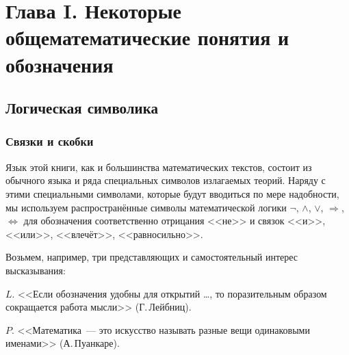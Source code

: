 
\chapter*{Глава I. Некоторые общематематические понятия и обозначения}

\section{Логическая символика}

\subsection{Связки и скобки}

Язык этой книги, как и большинства математических текстов, состоит из обычного языка и ряда специальных символов излагаемых теорий. Наряду с этими специальными символами, которые будут вводиться по мере надобности, мы используем распространённые символы математической логики $\neg$, $\land$, $\lor$, $\Rightarrow$, $\Leftrightarrow$ для обозначения соответственно отрицания <<не>> и связок <<и>>, <<или>>, <<влечёт>>, <<равносильно>>\footnotemark[1].

Возьмем, например, три представляющих и самостоятельный интерес высказывания:

$L$. <<Если обозначения удобны для открытий \ldots, то поразительным образом сокращается работа мысли>> (Г.\,Лейбниц\footnotemark[2]).


$P$. <<Математика~--- это искусство  называть разные вещи одинаковыми именами>> (А.\,Пуанкаре\footnotemark[3]).


